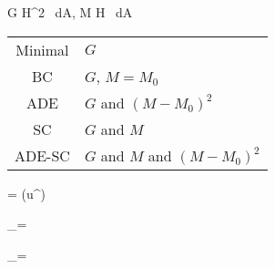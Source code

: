 \be
G \propto \int H^2 \, dA, \quad M \propto \int H \, dA
\ee

\begin{tabular}{cl}
Minimal &  $G$ \\
BC & $G$, $M = M_0$ \\
ADE & $G$ and $(M - M_0)^2$ \\
SC & $G$ and $M$ \\
ADE-SC & $G$ and $M$ and $(M - M_0)^2$
\end{tabular}

\eframe



\be
\rb = \rb (u^\alpha)
\ee

\be
{}_\alpha = 
\ee

\be
{}_\alpha = 
\ee


\eframe

